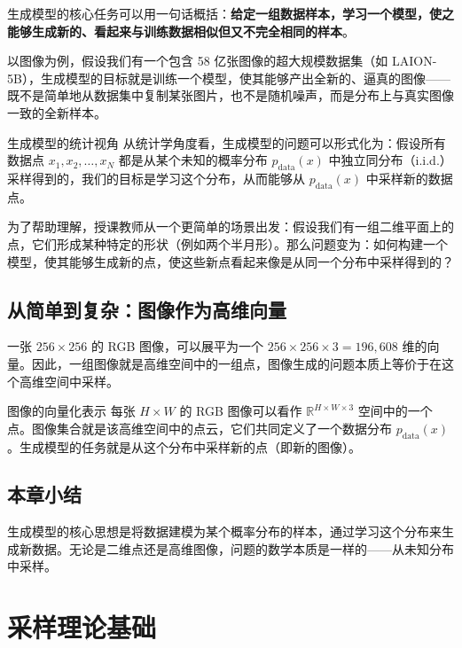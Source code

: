 \documentclass[a4paper]{article}
\begin{document}
生成模型的核心任务可以用一句话概括：\textbf{给定一组数据样本，学习一个模型，使之能够生成新的、看起来与训练数据相似但又不完全相同的样本}。

以图像为例，假设我们有一个包含 58 亿张图像的超大规模数据集（如 LAION-5B），生成模型的目标就是训练一个模型，使其能够产出全新的、逼真的图像——既不是简单地从数据集中复制某张图片，也不是随机噪声，而是分布上与真实图像一致的全新样本。

\begin{importantbox}{生成模型的统计视角}
从统计学角度看，生成模型的问题可以形式化为：假设所有数据点 $x_1, x_2, \ldots, x_N$ 都是从某个未知的概率分布 $p_{\text{data}}(x)$ 中独立同分布（i.i.d.）采样得到的，我们的目标是学习这个分布，从而能够从 $p_{\text{data}}(x)$ 中采样新的数据点。
\end{importantbox}

为了帮助理解，授课教师从一个更简单的场景出发：假设我们有一组二维平面上的点，它们形成某种特定的形状（例如两个半月形）。那么问题变为：如何构建一个模型，使其能够生成新的点，使这些新点看起来像是从同一个分布中采样得到的？

\subsection{从简单到复杂：图像作为高维向量}

一张 $256 \times 256$ 的 RGB 图像，可以展平为一个 $256 \times 256 \times 3 = 196{,}608$ 维的向量。因此，一组图像就是高维空间中的一组点，图像生成的问题本质上等价于在这个高维空间中采样。

\begin{knowledgebox}{图像的向量化表示}
每张 $H \times W$ 的 RGB 图像可以看作 $\mathbb{R}^{H \times W \times 3}$ 空间中的一个点。图像集合就是该高维空间中的点云，它们共同定义了一个数据分布 $p_{\text{data}}(x)$。生成模型的任务就是从这个分布中采样新的点（即新的图像）。
\end{knowledgebox}

\subsection{本章小结}

生成模型的核心思想是将数据建模为某个概率分布的样本，通过学习这个分布来生成新数据。无论是二维点还是高维图像，问题的数学本质是一样的——从未知分布中采样。

\newpage
\section{采样理论基础}
\end{document}

